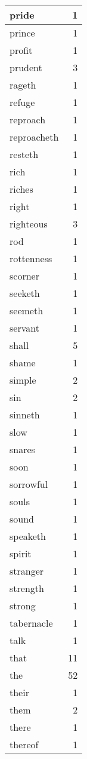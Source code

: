 \begin{center}
\begin{longtable}{l|r}
pride & 1\\ \hline 
prince & 1\\ \hline 
profit & 1\\ \hline 
prudent & 3\\ \hline 
rageth & 1\\ \hline 
refuge & 1\\ \hline 
reproach & 1\\ \hline 
reproacheth & 1\\ \hline 
resteth & 1\\ \hline 
rich & 1\\ \hline 
riches & 1\\ \hline 
right & 1\\ \hline 
righteous & 3\\ \hline 
rod & 1\\ \hline 
rottenness & 1\\ \hline 
scorner & 1\\ \hline 
seeketh & 1\\ \hline 
seemeth & 1\\ \hline 
servant & 1\\ \hline 
shall & 5\\ \hline 
shame & 1\\ \hline 
simple & 2\\ \hline 
sin & 2\\ \hline 
sinneth & 1\\ \hline 
slow & 1\\ \hline 
snares & 1\\ \hline 
soon & 1\\ \hline 
sorrowful & 1\\ \hline 
souls & 1\\ \hline 
sound & 1\\ \hline 
speaketh & 1\\ \hline 
spirit & 1\\ \hline 
stranger & 1\\ \hline 
strength & 1\\ \hline 
strong & 1\\ \hline 
tabernacle & 1\\ \hline 
talk & 1\\ \hline 
that & 11\\ \hline 
the & 52\\ \hline 
their & 1\\ \hline 
them & 2\\ \hline 
there & 1\\ \hline 
thereof & 1\\ \hline 

\end{longtable}
\end{center}
